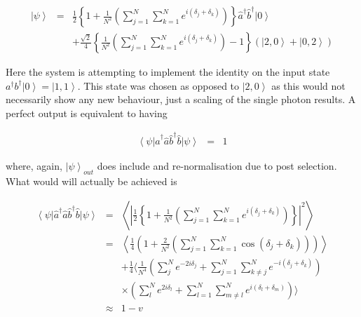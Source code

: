 \documentclass[aps,pra,twocolumn,superscriptaddress,numerical]{revtex4-1}
\begin{document}
		\begin{widetext}
			\begin{eqnarray}
				\left|\psi\right\rangle & = & \frac{1}{2}\left\{ 1+\frac{1}{N^{2}}\left(\sum_{j=1}^{N}\sum_{k=1}^{N}e^{i(\delta_{j}+\delta_{k})}\right)\right\} \hat{a}^{\dagger}\hat{b}^{\dagger}\left|0\right\rangle \nonumber \\
			 	& & +\frac{\sqrt{2}}{4}\left\{ \frac{1}{N^{2}}\left(\sum_{j=1}^{N}\sum_{k=1}^{N}e^{i(\delta_{j}+\delta_{k})}\right)-1\right\} \left(\left|2,0\right\rangle +\left|0,2\right\rangle \right)\label{eq:2pNarbitrary S}
			\end{eqnarray}
		\end{widetext}
		
		Here the system is attempting to implement the identity on the input state $a^{\dagger}b^{\dagger}\left|0\right\rangle =\left|1,1\right\rangle $. This state was chosen as opposed to $\left|2,0\right\rangle $ as this would not necessarily show any new behaviour, just a scaling of the single photon results. A perfect output is equivalent to having
		
		\begin{eqnarray}
			\left\langle \psi\right|\hat{a}^{\dagger}\hat{a}\hat{b}^{\dagger}\hat{b}\left|\psi\right\rangle & = & 1
		\end{eqnarray}
		
		
		where, again, $\left|\psi\right\rangle _{out}$ does include and re-normalisation due to post selection. What would will actually be achieved is
		
		\begin{eqnarray}
			\left\langle \psi\right|\hat{a}^{\dagger}\hat{a}\hat{b}^{\dagger}\hat{b}\left|\psi\right\rangle & = & \left\langle \left|\frac{1}{2}\left\{ 1+\frac{1}{N^{2}}\left(\sum_{j=1}^{N}\sum_{k=1}^{N}e^{i(\delta_{j}+\delta_{k})}\right)\right\} \right|^{2}\right\rangle \nonumber \\
			& = & \left\langle \frac{1}{4}\left(1+\frac{2}{N^{2}}\left(\sum_{j=1}^{N}\sum_{k=1}^{N}\cos\left(\delta_{j}+\delta_{k}\right)\right)\right)\right\rangle \nonumber \\
			&  & +\frac{1}{4}\Biggl\langle\frac{1}{N^{4}}\left(\sum_{j}^{N}e^{-2i\delta_{j}}+\sum_{j=1}^{N}\sum_{k\ne j}^{N}e^{-i(\delta_{j}+\delta_{k})}\right)\nonumber \\
			&  & \times\left(\sum_{l}^{N}e^{2i\delta_{l}}+\sum_{l=1}^{N}\sum_{m\ne l}^{N}e^{i(\delta_{l}+\delta_{m})}\right)\Biggr\rangle\nonumber \\
			& \approx & 1-v\label{eq:exp. value aabb}
		\end{eqnarray}
		
\end{document}
